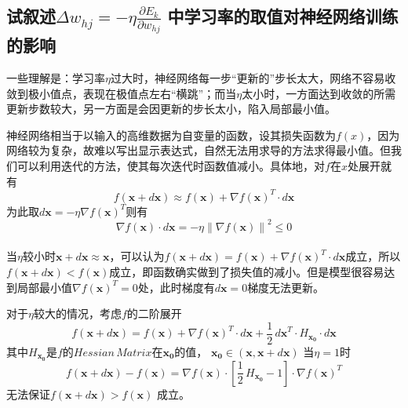 \documentclass[12pt, a4paper, oneside]{ctexart}
\begin{document}
\subsection{试叙述\texorpdfstring{$ \Delta w_{hj}= -\eta \frac{\partial E_k}{\partial w_{hj}} $ }.中学习率的取值对神经网络训练的影响}
\par 一些理解是：学习率$\eta$过大时，神经网络每一步“更新的”步长太大，网络不容易收敛到极小值点，表现在极值点左右“横跳”；而当$\eta$太小时，一方面达到收敛的所需更新步数较大，另一方面是会因更新的步长太小，陷入局部最小值。
\par 神经网络相当于以输入的高维数据为自变量的函数，设其损失函数为$f(x)$，因为网络较为复杂，故难以写出显示表达式，自然无法用求导的方法求得最小值。但我们可以利用迭代的方法，使其每次迭代时函数值减小。具体地，对$f$在$x$处展开就有
$$f(\boldsymbol{x}+d \boldsymbol{x}) \approx f(\boldsymbol{x})+{\nabla f(\boldsymbol{x})}^{T} \cdot d \boldsymbol{x}$$
为此取$d \boldsymbol{x} =-\eta \nabla { f(\boldsymbol{x})}^{T} $则有
$$\nabla f(\boldsymbol{x}) \cdot d \boldsymbol{x} =-\eta  {\left\| \nabla  f(\boldsymbol{x})  \right\|}^2 \leq 0$$
\\ %
当$\eta$较小时$\boldsymbol{x}+d \boldsymbol{x} \approx \boldsymbol{x}$，可以认为$f(\boldsymbol{x}+d \boldsymbol{x}) = f(\boldsymbol{x})+{\nabla f(\boldsymbol{x})}^{T} \cdot d \boldsymbol{x}$成立，所以$f(\boldsymbol{x}+d \boldsymbol{x})<f(\boldsymbol{x})$成立，即函数确实做到了损失值的减小。但是模型很容易达到局部最小值$\nabla { f(\boldsymbol{x})}^{T} =0$处，此时梯度有$d \boldsymbol{x}=0$梯度无法更新。
\par
对于$\eta$较大的情况，考虑$f$的二阶展开
$$f(\boldsymbol{x}+d \boldsymbol{x}) = f(\boldsymbol{x})+{\nabla f(\boldsymbol{x})}^{T} \cdot d \boldsymbol{x} + \frac{1}{2} \, {d \boldsymbol{x}}^{T} \cdot H_{\boldsymbol{x_0}} \cdot d \boldsymbol{x}$$ 其中$H_{\boldsymbol{x_0}}$是$f$的$Hessian \, Matrix$在$\boldsymbol{x_0}$的值， $\boldsymbol{x_0} \in ( \boldsymbol{x} ,\boldsymbol{x}+d \boldsymbol{x} )$
当$\eta=1$时
$$f(\boldsymbol{x}+d \boldsymbol{x}) - f(\boldsymbol{x})=\nabla f(\boldsymbol{x}) \cdot  [  \frac{1}{2} \, H_{\boldsymbol{x_0}}-1] \cdot  {\nabla f(\boldsymbol{x})}^T$$ 无法保证$f(\boldsymbol{x}+d \boldsymbol{x}) > f(\boldsymbol{x})$ 成立。
\end{document}
